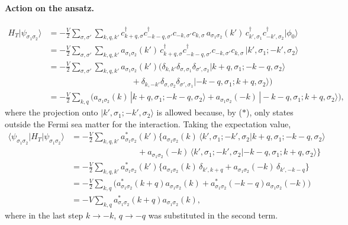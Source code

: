 \documentclass[../../main.tex]{subfiles}
\begin{document}
\paragraph{Action on the ansatz.}
\begin{align}
H_T|\psi_{\sigma_1\sigma_2}\rangle
&=-\frac{V}{2}\sum_{\sigma,\sigma'}\sum_{k,q,k'}
c^\dagger_{k+q,\sigma}c^\dagger_{-k-q,\sigma'}c_{-k,\sigma'}c_{k,\sigma}\,
a_{\sigma_1\sigma_2}(k')\,c^\dagger_{k',\sigma_1}c^\dagger_{-k',\sigma_2}|\phi_0\rangle\\
&=-\frac{V}{2}\sum_{\sigma,\sigma'}\sum_{k,q,k'}a_{\sigma_1\sigma_2}(k')\,
c^\dagger_{k+q,\sigma}c^\dagger_{-k-q,\sigma'}c_{-k,\sigma'}c_{k,\sigma}
\,|k',\sigma_1;-k',\sigma_2\rangle\\
&=-\frac{V}{2}\sum_{\sigma,\sigma'}\sum_{k,q,k'}a_{\sigma_1\sigma_2}(k')\Big(
 \delta_{k,k'}\delta_{\sigma,\sigma_1}\delta_{\sigma',\sigma_2}
 |k+q,\sigma_1;-k-q,\sigma_2\rangle\nonumber\\
&\hspace{10em}
 +\delta_{k,-k'}\delta_{\sigma,\sigma_2}\delta_{\sigma',\sigma_1}
 |-k-q,\sigma_1;k+q,\sigma_2\rangle\Big)\\
&=-\frac{V}{2}\sum_{k,q}\Big(a_{\sigma_1\sigma_2}(k)\,
 |k+q,\sigma_1;-k-q,\sigma_2\rangle
 +a_{\sigma_1\sigma_2}(-k)\,|-k-q,\sigma_1;k+q,\sigma_2\rangle\Big),
\end{align}
where the projection onto $|k',\sigma_1;-k',\sigma_2\rangle$ is allowed because, by
($\ast$), only states outside the Fermi sea matter for the interaction. Taking the
expectation value,
\begin{align}
\langle\psi_{\sigma_1\sigma_2}|H_T|\psi_{\sigma_1\sigma_2}\rangle
&=-\frac{V}{2}\sum_{k,q,k'}a^*_{\sigma_1\sigma_2}(k')\Big\{
 a_{\sigma_1\sigma_2}(k)\,
 \langle k',\sigma_1;-k',\sigma_2|k+q,\sigma_1;-k-q,\sigma_2\rangle\nonumber\\
&\hspace{8em}
 +a_{\sigma_1\sigma_2}(-k)\,
 \langle k',\sigma_1;-k',\sigma_2|-k-q,\sigma_1;k+q,\sigma_2\rangle\Big\}\\
&=-\frac{V}{2}\sum_{k,q,k'}a^*_{\sigma_1\sigma_2}(k')\Big\{
 a_{\sigma_1\sigma_2}(k)\,\delta_{k',k+q}
 +a_{\sigma_1\sigma_2}(-k)\,\delta_{k',-k-q}\Big\}\\
&=-\frac{V}{2}\sum_{k,q}\Big(a^*_{\sigma_1\sigma_2}(k+q)a_{\sigma_1\sigma_2}(k)
 +a^*_{\sigma_1\sigma_2}(-k-q)a_{\sigma_1\sigma_2}(-k)\Big)\\
&=-V\sum_{k,q}a^*_{\sigma_1\sigma_2}(k+q)a_{\sigma_1\sigma_2}(k),
\end{align}
where in the last step $k\to-k$, $q\to-q$ was substituted in the second term.
\end{document}
